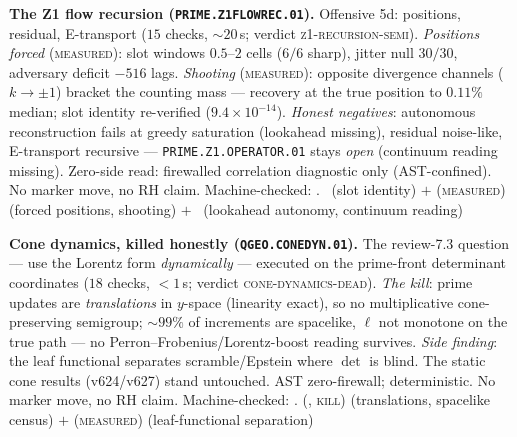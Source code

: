 \par\smallskip\noindent\textbf{The Z1 flow recursion
(\texttt{PRIME.Z1FLOWREC.01}).}
Offensive 5d: positions, residual, E-transport ($15$ checks,
${\sim}20$\,s; verdict \textsc{z1-recursion-semi}).  \emph{Positions
forced} (\textsc{measured}): slot windows $0.5$--$2$ cells ($6/6$
sharp), jitter null $30/30$, adversary deficit $-516$ lags.
\emph{Shooting} (\textsc{measured}): opposite divergence channels
($k\to\pm1$) bracket the counting mass --- recovery at the true
position to $0.11\%$ median; slot identity re-verified
($9.4\times10^{-14}$).  \emph{Honest negatives}: autonomous
reconstruction fails at greedy saturation (lookahead missing),
residual noise-like, E-transport recursive ---
\texttt{PRIME.Z1.OPERATOR.01} stays \emph{open} (continuum reading
missing).  Zero-side read: firewalled correlation diagnostic only
(AST-confined).  No marker move, no RH claim.
Machine-checked: .
\mE\ (slot identity) $+$ (\textsc{measured}) (forced positions,
shooting) $+$ \mO\ (lookahead autonomy, continuum reading)
\par\smallskip


\par\smallskip\noindent\textbf{Cone dynamics, killed honestly
(\texttt{QGEO.CONEDYN.01}).}
The review-7.3 question --- use the Lorentz form \emph{dynamically}
--- executed on the prime-front determinant coordinates ($18$
checks, ${<}1$\,s; verdict \textsc{cone-dynamics-dead}).  \emph{The
kill}: prime updates are \emph{translations} in $y$-space (linearity
exact), so no multiplicative cone-preserving semigroup;
${\sim}99\%$ of increments are spacelike, $\ell$ not monotone on the
true path --- no Perron--Frobenius/Lorentz-boost reading survives.
\emph{Side finding}: the leaf functional separates scramble/Epstein
where $\det$ is blind.  The static cone results (v624/v627) stand
untouched.  AST zero-firewall; deterministic.  No marker move, no RH
claim.
Machine-checked: .
(\mE, \textsc{kill}) (translations, spacelike census) $+$
(\textsc{measured}) (leaf-functional separation)
\par\smallskip


